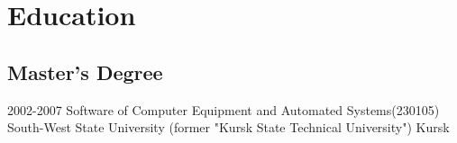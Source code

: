 \section
{Education}

\subsection
{Master's Degree}

\cventry
{2002-2007}
{Software of Computer Equipment and Automated Systems(230105)}
{South-West State University (former "Kursk State Technical University")}
{Kursk}
{}
{}
